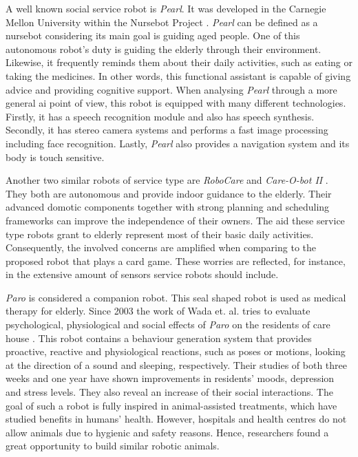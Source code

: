 A well known social service robot is \emph{Pearl}.
It was developed in the Carnegie Mellon University within the Nursebot Project \cite{Pollack2002}.
\emph{Pearl} can be defined as a nursebot considering its main goal is guiding aged people.
One of this autonomous robot's duty is guiding the elderly through their environment.
Likewise, it frequently reminds them about their daily activities, such as eating or taking the medicines.
In other words, this functional assistant is capable of giving advice and providing cognitive support.
When analysing \emph{Pearl} through a more general \gls{ai} point of view, this robot is equipped with many different technologies.
Firstly, it has a speech recognition module and also has speech synthesis.
Secondly, it has stereo camera systems and performs a fast image processing including face recognition.
Lastly, \emph{Pearl} also provides a navigation system and its body is touch sensitive.

Another two similar robots of service type are \emph{RoboCare} \cite{Bahadori} and \emph{Care-O-bot II} \cite{Graf2004}.
They both are autonomous and provide indoor guidance to the elderly.
Their advanced domotic components together with strong planning and scheduling frameworks can improve the independence of their owners.
The aid these service type robots grant to elderly represent most of their basic daily activities.
Consequently, the involved concerns are amplified when comparing to the proposed robot that plays a card game.
These worries are reflected, for instance, in the extensive amount of sensors service robots should include.

\emph{Paro} is considered a companion robot.
This seal shaped robot is used as medical therapy for elderly.
Since 2003 the work of Wada et. al. tries to evaluate psychological, physiological and social effects of \emph{Paro} on the residents of care house \cite{Wada2007,Wada2005,Wada2003}.
This robot contains a behaviour generation system that provides proactive, reactive and physiological reactions, such as poses or motions, looking at the direction of a sound and sleeping, respectively.
Their studies of both three weeks and one year have shown improvements in residents' moods, depression and stress levels.
They also reveal an increase of their social interactions.
The goal of such a robot is fully inspired in animal-assisted treatments, which have studied benefits in humans' health.
However, hospitals and health centres do not allow animals due to hygienic and safety reasons.
Hence, researchers found a great opportunity to build similar robotic animals.

